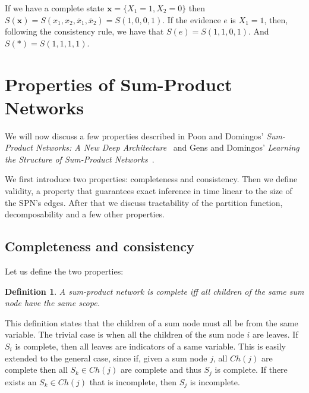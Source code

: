 \documentclass[a4paper,10pt]{article}
\theoremstyle{plain}
\newtheorem*{spn-def}{Definition}
\begin{document}
If we have a complete state $\mathbf{x}=\{X_1=1,X_2=0\}$ then $S(\mathbf{x})=S(x_1,x_2,
\overline{x}_1,\overline{x}_2)=S(1,0,0,1)$. If the evidence $e$ is $X_1=1$, then, following the
consistency rule, we have that $S(e)=S(1,1,0,1)$. And $S(*)=S(1,1,1,1)$.

\section{Properties of Sum-Product Networks}

We will now discuss a few properties described in Poon and Domingos' \textit{Sum-Product Networks:
A New Deep Architecture}~\cite{poon-domingos} and Gens and Domingos' \textit{Learning the Structure
of Sum-Product Networks}~\cite{gens-domingos}.

We first introduce two properties: completeness and consistency. Then we define validity, a
property that guarantees exact inference in time linear to the size of the SPN's edges. After that
we discuss tractability of the partition function, decomposability and a few other properties.

\subsection{Completeness and consistency}

Let us define the two properties:

\begin{spn-def}
  A sum-product network is complete iff all children of the same sum node have the same scope.
\end{spn-def}

This definition states that the children of a sum node must all be from the same variable.
The trivial case is when all the children of the sum node $i$ are leaves. If $S_i$ is complete,
then all leaves are indicators of a same variable. This is easily extended to the general case,
since if, given a sum node $j$, all $Ch(j)$ are complete then all $S_k\in Ch(j)$ are complete and
thus $S_j$ is complete. If there exists an $S_k\in Ch(j)$ that is incomplete, then $S_j$ is
incomplete.
\end{document}
